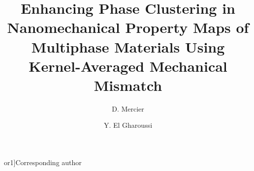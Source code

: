 \documentclass[final,3p,times]{elsarticle}
\def\corref#1{}%
\def\cortext#1#2{}%
\begin{document}
\begin{frontmatter}

\title{Enhancing Phase Clustering in Nanomechanical Property Maps of Multiphase Materials Using Kernel-Averaged Mechanical Mismatch}


\author[1]{D. Mercier\corref{cor1}}

\author[1,2]{Y. El Gharoussi}

\cortext[cor1]{Corresponding author}




\end{frontmatter}
\end{document}
